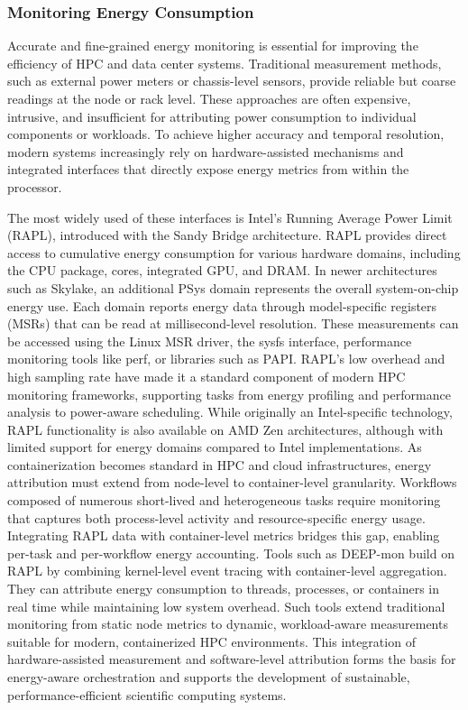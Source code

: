 \subsubsection{Monitoring Energy Consumption}
\label{sec:background_monitoring_energy}
Accurate and fine-grained energy monitoring is essential for improving the efficiency of HPC and data center systems. Traditional measurement methods, such as external power meters or chassis-level sensors, provide reliable but coarse readings at the node or rack level. These approaches are often expensive, intrusive, and insufficient for attributing power consumption to individual components or workloads. To achieve higher accuracy and temporal resolution, modern systems increasingly rely on hardware-assisted mechanisms and integrated interfaces that directly expose energy metrics from within the processor.

The most widely used of these interfaces is Intel’s Running Average Power Limit (RAPL), introduced with the Sandy Bridge architecture. RAPL provides direct access to cumulative energy consumption for various hardware domains, including the CPU package, cores, integrated GPU, and DRAM. In newer architectures such as Skylake, an additional PSys domain represents the overall system-on-chip energy use. Each domain reports energy data through model-specific registers (MSRs) that can be read at millisecond-level resolution. These measurements can be accessed using the Linux MSR driver, the sysfs interface, performance monitoring tools like perf, or libraries such as PAPI. RAPL’s low overhead and high sampling rate have made it a standard component of modern HPC monitoring frameworks, supporting tasks from energy profiling and performance analysis to power-aware scheduling. While originally an Intel-specific technology, RAPL functionality is also available on AMD Zen architectures, although with limited support for energy domains compared to Intel implementations.
As containerization becomes standard in HPC and cloud infrastructures, energy attribution must extend from node-level to container-level granularity. Workflows composed of numerous short-lived and heterogeneous tasks require monitoring that captures both process-level activity and resource-specific energy usage. Integrating RAPL data with container-level metrics bridges this gap, enabling per-task and per-workflow energy accounting.
Tools such as DEEP-mon build on RAPL by combining kernel-level event tracing with container-level aggregation. They can attribute energy consumption to threads, processes, or containers in real time while maintaining low system overhead. Such tools extend traditional monitoring from static node metrics to dynamic, workload-aware measurements suitable for modern, containerized HPC environments. This integration of hardware-assisted measurement and software-level attribution forms the basis for energy-aware orchestration and supports the development of sustainable, performance-efficient scientific computing systems.

